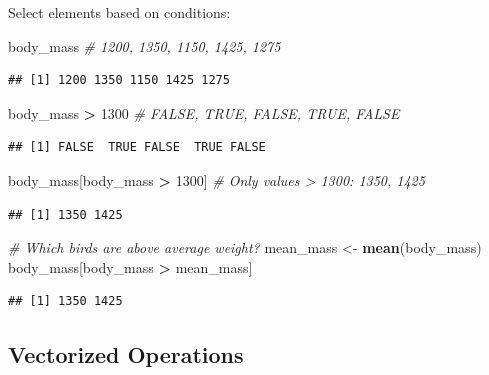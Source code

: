 \documentclass[
]{article}
\newenvironment{Shaded}{\begin{snugshade}}{\end{snugshade}}
\newcommand{\CommentTok}[1]{\textcolor[rgb]{0.56,0.35,0.01}{\textit{#1}}}
\newcommand{\DecValTok}[1]{\textcolor[rgb]{0.00,0.00,0.81}{#1}}
\newcommand{\FunctionTok}[1]{\textcolor[rgb]{0.13,0.29,0.53}{\textbf{#1}}}
\newcommand{\NormalTok}[1]{#1}
\newcommand{\OtherTok}[1]{\textcolor[rgb]{0.56,0.35,0.01}{#1}}
\newcommand{\SpecialCharTok}[1]{\textcolor[rgb]{0.81,0.36,0.00}{\textbf{#1}}}
\begin{document}
Select elements based on conditions:

\begin{Shaded}
\begin{Highlighting}[]
\NormalTok{body\_mass                   }\CommentTok{\# 1200, 1350, 1150, 1425, 1275}
\end{Highlighting}
\end{Shaded}

\begin{verbatim}
## [1] 1200 1350 1150 1425 1275
\end{verbatim}

\begin{Shaded}
\begin{Highlighting}[]
\NormalTok{body\_mass }\SpecialCharTok{\textgreater{}} \DecValTok{1300}            \CommentTok{\# FALSE, TRUE, FALSE, TRUE, FALSE}
\end{Highlighting}
\end{Shaded}

\begin{verbatim}
## [1] FALSE  TRUE FALSE  TRUE FALSE
\end{verbatim}

\begin{Shaded}
\begin{Highlighting}[]
\NormalTok{body\_mass[body\_mass }\SpecialCharTok{\textgreater{}} \DecValTok{1300}\NormalTok{] }\CommentTok{\# Only values \textgreater{} 1300: 1350, 1425}
\end{Highlighting}
\end{Shaded}

\begin{verbatim}
## [1] 1350 1425
\end{verbatim}

\begin{Shaded}
\begin{Highlighting}[]
\CommentTok{\# Which birds are above average weight?}
\NormalTok{mean\_mass }\OtherTok{\textless{}{-}} \FunctionTok{mean}\NormalTok{(body\_mass)}
\NormalTok{body\_mass[body\_mass }\SpecialCharTok{\textgreater{}}\NormalTok{ mean\_mass]}
\end{Highlighting}
\end{Shaded}

\begin{verbatim}
## [1] 1350 1425
\end{verbatim}

\subsection{Vectorized Operations}\label{vectorized-operations}
\end{document}
